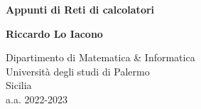 \documentclass{subfiles}
\begin{document}
\begin{titlepage}
    \begin{center}
        \vspace*{1cm}

        \textbf{Appunti di Reti di calcolatori}

        \vspace{1.5cm}

        \textbf{Riccardo Lo Iacono}

        \vfill

        \vspace{0.8cm}

        Dipartimento di Matematica \& Informatica\\
        Università degli studi di Palermo\\
        Sicilia\\
        a.a. 2022-2023

    \end{center}
\end{titlepage}
\end{document}
